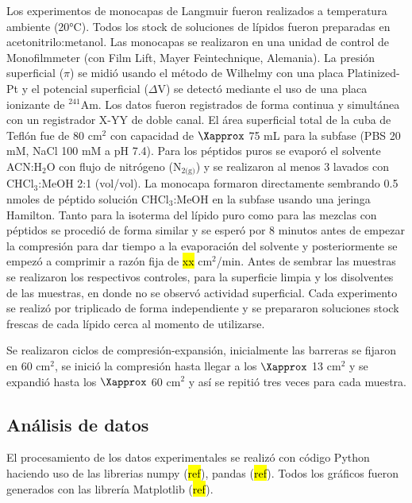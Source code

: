 Los experimentos de monocapas de Langmuir fueron realizados a temperatura ambiente (20°C). Todos los stock de soluciones de lípidos fueron preparadas en acetonitrilo:metanol. Las monocapas se realizaron en una unidad de control de Monofilmmeter (con Film Lift, Mayer Feintechnique, Alemania). La presión superficial ($\pi$) se midió usando el método de Wilhelmy con una placa Platinized-Pt y el potencial superficial ($\Delta$V) se detectó mediante el uso de una placa ionizante de $^{241}$Am. Los datos fueron registrados de forma continua y simultánea con un registrador X-YY de doble canal. El área superficial total de la cuba de Teflón fue de 80 cm$^2$ con capacidad de $\Xapprox$ 75 mL para la subfase (PBS 20 mM, NaCl 100 mM a pH 7.4). Para los péptidos puros se evaporó el solvente ACN:H$_2$O con flujo de nitrógeno (N$_{2 \text{(g)}}$) y se realizaron al menos 3 lavados con CHCl$_3$:MeOH 2:1 (vol/vol). La monocapa formaron directamente sembrando 0.5 nmoles de péptido solución CHCl$_3$:MeOH  en la subfase usando una jeringa Hamilton. Tanto para la isoterma del lípido puro como para las mezclas con péptidos se procedió de forma similar y se esperó por 8 minutos antes de empezar la compresión para dar tiempo a la evaporación del solvente y posteriormente se empezó a comprimir a razón fija de \hl{xx} cm$^2$/min. Antes de sembrar las muestras se realizaron los respectivos controles, para la superficie limpia y los disolventes de las muestras, en donde no se observó actividad superficial. Cada experimento se realizó por triplicado de forma independiente y se prepararon soluciones stock frescas de cada lípido cerca al momento de utilizarse.

Se realizaron ciclos de compresión-expansión, inicialmente las barreras se fijaron en 60 cm$^2$, se inició la compresión hasta llegar a los $\Xapprox$ 13 cm$^2$ y se expandió hasta los $\Xapprox$ 60 cm$^2$ y así se repitió tres veces para cada muestra.


\subsection{Análisis de datos}

El procesamiento de los datos experimentales se realizó con código Python haciendo uso de las librerias  numpy (\hl{ref}), pandas (\hl{ref}). Todos los gráficos fueron generados con las librería Matplotlib (\hl{ref}).

